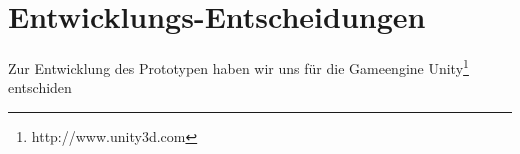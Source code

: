 \section{Entwicklungs-Entscheidungen}
Zur Entwicklung des Prototypen haben wir uns für die Gameengine Unity\footnote{http://www.unity3d.com} entschiden